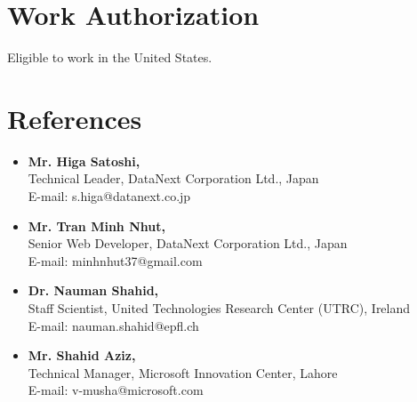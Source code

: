 \documentclass[margin,line]{res}
\begin{document}
\begin{resume}
\section{Work Authorization}
Eligible to work in the United States.
\section{References}
\begin{itemize} \itemsep -2pt  %
  \item {\bf Mr. Higa Satoshi,}\\
  Technical Leader, DataNext Corporation Ltd., Japan \\
  E-mail: s.higa@datanext.co.jp \\

  \item {\bf Mr. Tran Minh Nhut,}\\
  Senior Web Developer, DataNext Corporation Ltd., Japan \\
  E-mail: minhnhut37@gmail.com \\

  \item {\bf Dr. Nauman Shahid,}\\
  Staff Scientist, United Technologies Research Center (UTRC), Ireland \\
  E-mail: nauman.shahid@epfl.ch \\

  \item {\bf Mr. Shahid Aziz,}\\
  Technical Manager, Microsoft Innovation Center, Lahore \\
  E-mail: v-musha@microsoft.com \\

\end{itemize}

\end{resume} 
\end{document}

